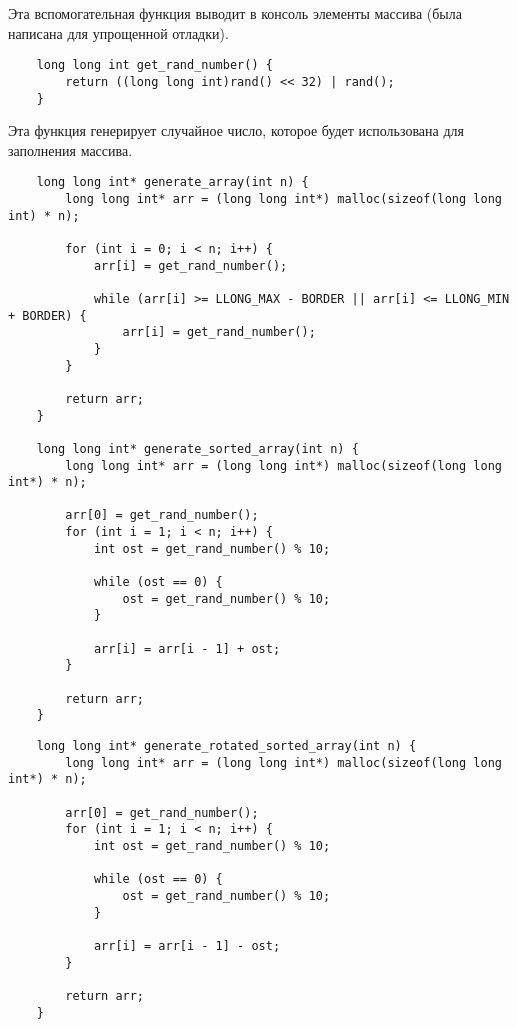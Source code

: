 \documentclass[a4paper,12pt,titlepage,finall]{article}
\begin{document}
Эта вспомогательная функция выводит в консоль элементы массива (была написана для упрощенной отладки).

\begin{verbatim}
    long long int get_rand_number() {
        return ((long long int)rand() << 32) | rand();
    }
\end{verbatim}

Эта функция генерирует случайное число, которое будет использована для заполнения массива.

\begin{verbatim}
    long long int* generate_array(int n) {
        long long int* arr = (long long int*) malloc(sizeof(long long int) * n);

        for (int i = 0; i < n; i++) {
            arr[i] = get_rand_number();

            while (arr[i] >= LLONG_MAX - BORDER || arr[i] <= LLONG_MIN + BORDER) {
                arr[i] = get_rand_number();
            }
        }

        return arr;
    }

    long long int* generate_sorted_array(int n) {
        long long int* arr = (long long int*) malloc(sizeof(long long int*) * n);

        arr[0] = get_rand_number();
        for (int i = 1; i < n; i++) {
            int ost = get_rand_number() % 10;
            
            while (ost == 0) {
                ost = get_rand_number() % 10;
            }

            arr[i] = arr[i - 1] + ost;
        }

        return arr;
    }
\end{verbatim}

\newpage

\begin{verbatim}
    long long int* generate_rotated_sorted_array(int n) {
        long long int* arr = (long long int*) malloc(sizeof(long long int*) * n);

        arr[0] = get_rand_number();
        for (int i = 1; i < n; i++) {
            int ost = get_rand_number() % 10;
            
            while (ost == 0) {
                ost = get_rand_number() % 10;
            }

            arr[i] = arr[i - 1] - ost;
        }

        return arr;
    }
\end{verbatim}
\end{document}
